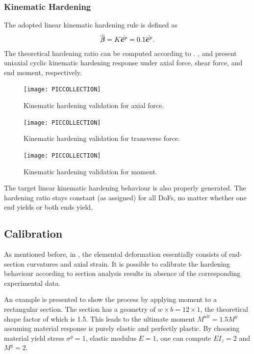 \subsubsection{Kinematic Hardening}
The adopted linear kinematic hardening rule is defined as
\begin{gather}
\dot{\overline{\bm{\beta}}}=K\dot{\overline{\bm{e}}^p}=0.1\dot{\overline{\bm{e}}^p}.
\end{gather}
The theoretical hardening ratio can be computed according to .
,  and  present uniaxial cyclic kinematic hardening response under axial force, shear force, and end moment, respectively.
\begin{figure}[htb]
\centering\footnotesize
\texttt{[image: PICCOLLECTION]}
\caption{Kinematic hardening validation for axial force.}\label{fig:kin_hardening_a}
\end{figure}
\begin{figure}[htb]
\centering\footnotesize
\texttt{[image: PICCOLLECTION]}
\caption{Kinematic hardening validation for transverse force.}\label{fig:kin_hardening_b}
\end{figure}
\begin{figure}[htb]
\centering\footnotesize
\texttt{[image: PICCOLLECTION]}
\caption{Kinematic hardening validation for moment.}\label{fig:kin_hardening_c}
\end{figure}
The target linear kinematic hardening behaviour is also properly generated.
The hardening ratio stays constant (as assigned) for all DoFs, no matter whether one end yields or both ends yield.
\subsection{Calibration}
As mentioned before, in , the elemental deformation essentially consists of end-section curvatures and axial strain. It is possible to calibrate the hardening behaviour according to section analysis results in absence of the corresponding experimental data.

An example is presented to show the process by applying moment to a rectangular section.
The section has a geometry of $w\times{}b=12\times1$, the theoretical shape factor of which is \num{1.5}.
This leads to the ultimate moment $M^{ult}=1.5M^y$ assuming material response is purely elastic and perfectly plastic.
By choosing material yield stress $\sigma^y=1$, elastic modulus $E=1$, one can compute $EI_z=2$ and $M^y=2$.

